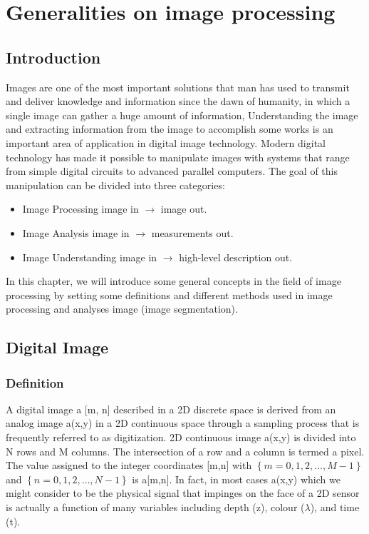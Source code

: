 
\chapter{Generalities on image processing}\label{ch:generalities-on-image-processing}
\chead{}
\lhead{\bfseries \chaptername {\,} \thechapter }
\cfoot{\bfseries \thepage}
\rhead{}

\section{Introduction}\label{sec:introduction-ch1}
Images are one of the most important solutions that man has used to transmit and deliver knowledge and information since the dawn of humanity, in which a single image can gather a huge amount of information, Understanding the image and extracting information from the image to accomplish some works is an important area of application in digital image technology.
Modern digital technology has made it possible to manipulate images with systems that range from simple digital circuits to advanced parallel computers. The goal of this manipulation can be divided into three categories:
\begin{itemize}
        \item Image Processing\hspace{2cm} image in $\rightarrow$ image out.
        \item Image Analysis\hspace{2.4cm} image in $\rightarrow$ measurements out.
        \item Image Understanding\hspace{1.3cm} image in $\rightarrow$ high-level description out.
\end{itemize}
In this chapter, we will introduce some general concepts in the field of image processing by setting some definitions and different methods used in image processing and analyses image (image segmentation).


\section{Digital Image}\label{sec:Digital-Image}
\subsection{Definition}\label{subsec:definition}

A digital image a [m, n] described in a 2D discrete space is derived from an analog image a(x,y) in a 2D continuous space through a sampling process that is frequently referred to as digitization.
2D continuous image a(x,y) is divided into N rows and M columns.
The intersection of a row and a column is termed a pixel.
The value assigned to the integer coordinates [m,n] with $\left\{ m=0,1,2, \ldots ,M - 1 \right\}$ and $\left\{ n=0,1,2,\ldots,N - 1 \right\}$ is a[m,n].
In fact, in most cases a(x,y) which we might consider to be the physical signal that impinges on the face of a 2D sensor is actually a function of many variables including depth (z), colour ($\lambda$), and time (t).\\

